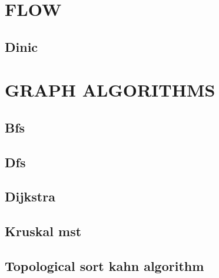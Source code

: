 \documentclass[11pt]{article}
\begin{document}
\section{FLOW}

\subsection{\texorpdfstring{Dinic}{Dinic}}


\section{GRAPH ALGORITHMS}

\subsection{\texorpdfstring{Bfs}{Bfs}}


\subsection{\texorpdfstring{Dfs}{Dfs}}


\subsection{\texorpdfstring{Dijkstra}{Dijkstra}}


\subsection{\texorpdfstring{Kruskal mst}{Kruskal mst}}


\subsection{\texorpdfstring{Topological sort kahn algorithm}{Topological sort kahn algorithm}}

\end{document}

